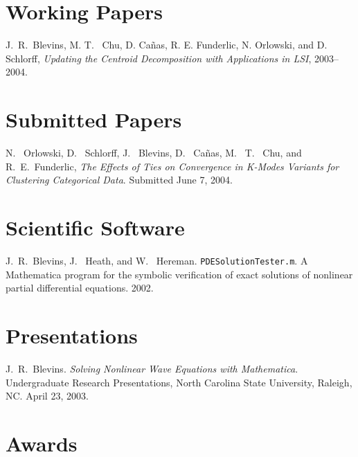 \documentclass[overlapped,line,draft,11pt,letterpaper]{res}
\begin{document}
\begin{resume}
\newpage

\section{\bf Working Papers}

J.\ R.\ Blevins, M. T. \ Chu, D. Ca\~{n}as, R. E. Funderlic, N.
Orlowski, and D. Schlorff, {\em Updating the Centroid Decomposition
  with Applications in LSI}, 2003--2004.


\section{\bf Submitted Papers}

N. \ Orlowski, D. \ Schlorff, J. \ Blevins, D. \ Ca\~{n}as, M. \ T. \
Chu, and R.\ E.\ Funderlic, {\em The Effects of Ties on Convergence in
  K-Modes Variants for Clustering Categorical Data}. Submitted June 7,
2004.


\section{\bf Scientific Software}

J.\ R.\ Blevins, J. \ Heath, and W. \ Hereman.
\texttt{PDESolutionTester.m}.  A Mathematica program for the symbolic
verification of exact solutions of nonlinear partial differential
equations. 2002.


\section{\bf Presentations}

J.\ R.\ Blevins. {\em Solving Nonlinear Wave Equations with
  Mathematica}. Undergraduate Research Presentations, North Carolina
State University, Raleigh, NC. April 23, 2003.



\section{\bf Awards}


\end{resume}
\end{document}
